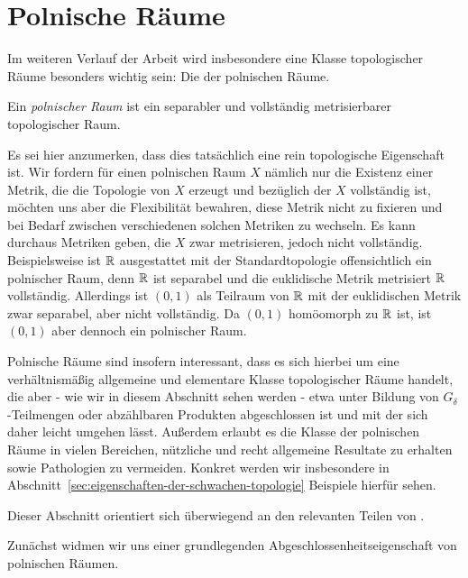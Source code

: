 \documentclass[../main/main.tex]{subfiles}
\begin{document}
	
	\section{Polnische Räume}
	
	Im weiteren Verlauf der Arbeit wird insbesondere eine Klasse topologischer Räume besonders wichtig sein: Die der polnischen Räume.
	
	\begin{Definition}
		Ein \emph{polnischer Raum} ist ein separabler und vollständig metrisierbarer topologischer Raum.
	\end{Definition}

	\begin{Bemerkung}
		Es sei hier anzumerken, dass dies tatsächlich eine rein topologische Eigenschaft ist. Wir fordern für einen polnischen Raum $X$ nämlich nur die Existenz einer Metrik,
		die die Topologie von $X$ erzeugt und bezüglich der $X$ vollständig ist, möchten uns aber die Flexibilität
		bewahren, diese Metrik nicht zu fixieren und bei Bedarf zwischen verschiedenen solchen Metriken
		zu wechseln. Es kann durchaus Metriken geben, die $X$ zwar metrisieren, jedoch nicht vollständig.
		Beispielsweise ist $\mathbb{R}$ ausgestattet mit der Standardtopologie offensichtlich ein polnischer Raum,
		denn $\mathbb{R}$ ist separabel und die euklidische Metrik metrisiert $\mathbb{R}$ vollständig. 
		Allerdings ist $(0, 1)$ als Teilraum von $\mathbb{R}$ mit der euklidischen Metrik zwar separabel, aber nicht vollständig.
		Da $(0, 1)$ homöomorph zu $\mathbb{R}$ ist, ist $(0, 1)$ aber dennoch ein polnischer Raum.
	\end{Bemerkung}

	Polnische Räume sind insofern interessant, dass es sich hierbei um eine verhältnismäßig allgemeine und elementare Klasse topologischer Räume handelt, die aber - wie wir in diesem Abschnitt sehen werden - 
	etwa unter Bildung von $G_\delta$-Teilmengen oder abzählbaren Produkten abgeschlossen ist und mit der sich daher leicht umgehen lässt. Außerdem erlaubt es die Klasse der polnischen Räume in vielen Bereichen, 
	nützliche und recht allgemeine Resultate zu erhalten sowie Pathologien zu vermeiden. Konkret werden wir insbesondere in Abschnitt~\ref{sec:eigenschaften-der-schwachen-topologie} Beispiele hierfür sehen.
	
	Dieser Abschnitt orientiert sich überwiegend an den relevanten Teilen von \cite[Kapitel 4.14]{Simon.2015}. 
	
	Zunächst widmen wir uns einer grundlegenden Abgeschlossenheitseigenschaft von polnischen Räumen.
	
\end{document}
